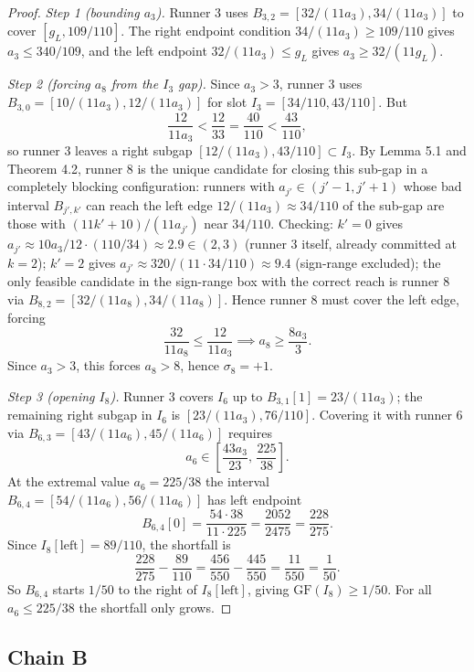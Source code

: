 \documentclass[12pt]{article}
\begin{document}
\begin{proof}
\emph{Step 1 (bounding $a_3$).} Runner 3 uses $B_{3,2}=[32/(11a_3),34/(11a_3)]$
to cover $[g_L,109/110]$. The right endpoint condition $34/(11a_3)\ge 109/110$
gives $a_3\le 340/109$, and the left endpoint $32/(11a_3)\le g_L$
gives $a_3\ge 32/(11g_L)$.

\emph{Step 2 (forcing $a_8$ from the $I_3$ gap).} Since $a_3>3$, runner 3 uses
$B_{3,0}=[10/(11a_3),12/(11a_3)]$ for slot $I_3=[34/110,43/110]$. But
\[
\frac{12}{11a_3} < \frac{12}{33} = \frac{40}{110} < \frac{43}{110},
\]
so runner 3 leaves a right subgap $[12/(11a_3),43/110]\subset I_3$. By
Lemma 5.1 and Theorem 4.2, runner 8 is the unique candidate for closing this sub-gap in
a completely blocking configuration: runners with $a_{j'}\in(j'-1,j'+1)$ whose bad
interval $B_{j',k'}$ can reach the left edge $12/(11a_3)\approx 34/110$ of the sub-gap
are those with $(11k'+10)/(11a_{j'})$ near $34/110$. Checking: $k'=0$ gives
$a_{j'}\approx 10a_3/12\cdot (110/34)\approx 2.9\in(2,3)$ (runner 3 itself, already
committed at $k=2$); $k'=2$ gives $a_{j'}\approx 320/(11\cdot 34/110)\approx 9.4$
(sign-range excluded); the only feasible candidate in the sign-range box with the correct
reach is runner 8 via $B_{8,2}=[32/(11a_8),34/(11a_8)]$.
Hence runner 8 must cover the left edge, forcing
\[
\frac{32}{11a_8} \le \frac{12}{11a_3} \implies a_8 \ge \frac{8a_3}{3}.
\]
Since $a_3>3$, this forces $a_8>8$, hence $\sigma_8=+1$.

\emph{Step 3 (opening $I_8$).} Runner 3 covers $I_6$ up to $B_{3,1}[1]=23/(11a_3)$;
the remaining right subgap in $I_6$ is $[23/(11a_3),76/110]$. Covering it with runner 6
via $B_{6,3}=[43/(11a_6),45/(11a_6)]$ requires
\[
a_6 \in \left[\frac{43a_3}{23},\,\frac{225}{38}\right].
\]
At the extremal value $a_6=225/38$ the interval $B_{6,4}=[54/(11a_6),56/(11a_6)]$ has
left endpoint
\[
B_{6,4}[0] = \frac{54\cdot 38}{11\cdot 225} = \frac{2052}{2475} = \frac{228}{275}.
\]
Since $I_8[\mathrm{left}]=89/110$, the shortfall is
\[
\frac{228}{275} - \frac{89}{110}
  = \frac{456}{550} - \frac{445}{550}
  = \frac{11}{550} = \frac{1}{50}.
\]
So $B_{6,4}$ starts $1/50$ to the right of $I_8[\mathrm{left}]$, giving
$\mathrm{GF}(I_8)\ge 1/50$. For all $a_6\le 225/38$ the shortfall only grows.
\end{proof}

\subsection{Chain B}
\end{document}
